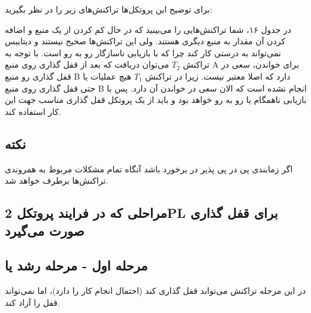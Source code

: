 \documentclass[a4paper]{article}
\begin{document}
برای توضیح این پروتکل‌ها تراکنش‌های زیر را در نظر بگیرید:

\begin{LTR}
    \begin{table}[h]
        \begin{RTL}
            \caption{زمانبندی $S_{5}$}
        \end{RTL}
        \centering
    \end{table}
\end{LTR}

در جدول ۱۶، شما تراکنش‌هایی را می‌بینید که در حال کم کردن از یک منبع و اضافه
کردن آن مقدار به منبع دیگری هستند. ولی این تراکنش‌ها صحیح نیستند و دیتابیس
نمی‌تواند به درستی کار کند چرا که با بازیابی ناسازگار رو به رو است. با توجه به
تراکنش $T_{2}$ می‌توان دریافت که بعد از قفل گذاری روی منبع A برای خواندن، سعی در
قفل گذاری رو منبع B دارد که اصلا معتبر نیست. زیرا در تراکنش $T_{1}$ هیچ عملیات
یا حتی قفل گذاری روی منبع B انجام نشده است که الان سعی در خواندن آن دارد. پس با
بازیابی ناهمگام یا  رو به رو خواهد بود و باید از یک
پروتکل قفل گذاری مناسب جهت این کار استفاده کند.

\subsection*{نکته}

اگر زمابندی پی در پی پذیر در برخورد باشد آنگاه تمام مشکلات مربوط به
همروندی تراکنش‌ها برطرف خواهد شد.

\subsection{مراحلی که در فرایند پروتکل 2PL برای قفل گذاری صورت می‌گیرد}

\subsection*{مرحله اول - مرحله رشد یا }

در این مرحله تراکنش می‌تواند قفل گذاری کند (احتمال انجام کار را دارد)، اما
نمی‌تواند قفل را آزاد کند.
\end{document}
